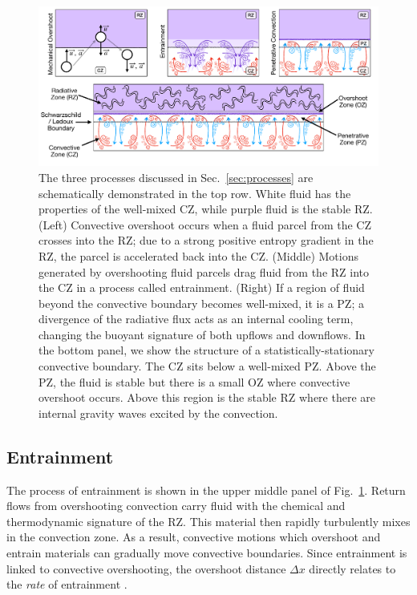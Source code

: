 \begin{figure}[t]
\centering
\includegraphics[width=\textwidth]{processes_and_structure_figure.pdf}
\caption{
    The three processes discussed in Sec.~\ref{sec:processes} are schematically demonstrated in the top row.
    White fluid has the properties of the well-mixed CZ, while purple fluid is the stable RZ.
    (Left) Convective overshoot occurs when a fluid parcel from the CZ crosses into the RZ; due to a strong positive entropy gradient in the RZ, the parcel is accelerated back into the CZ.
    (Middle) Motions generated by overshooting fluid parcels drag fluid from the RZ into the CZ in a process called entrainment.
    (Right) If a region of fluid beyond the convective boundary becomes well-mixed, it is a PZ; a divergence of the radiative flux acts as an internal cooling term, changing the buoyant signature of both upflows and downflows.
    In the bottom panel, we show the structure of a statistically-stationary convective boundary.
    The CZ sits below a well-mixed PZ.
    Above the PZ, the fluid is stable but there is a small OZ where convective overshoot occurs.
    Above this region is the stable RZ where there are internal gravity waves excited by the convection.
\label{fig:schema}
}
\end{figure}





\subsection{Entrainment}
The process of entrainment is shown in the upper middle panel of Fig.~\ref{fig:schema}.
Return flows from overshooting convection carry fluid with the chemical and thermodynamic signature of the RZ.
This material then rapidly turbulently mixes in the convection zone.
As a result, convective motions which overshoot and entrain materials can gradually move convective boundaries.
Since entrainment is linked to convective overshooting, the overshoot distance $\Delta x$ directly relates to the \emph{rate} of entrainment \citep[which can be inferred from frequently-plotted entrainment rate laws;][]{meakin_arnett_2007}.

